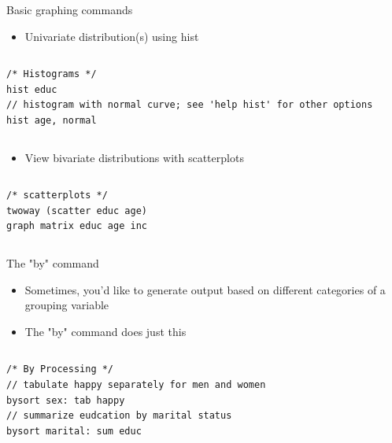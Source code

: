 \documentclass[table,smaller]{beamer}
\begin{document}
\begin{frame}[fragile,label=sec-3-1]{Basic graphing commands}
 \begin{itemize}
\item Univariate distribution(s) using \alert{hist}
\end{itemize}
\vspace{-.5em} \begin{columns}  \begin{block}{}
\begin{verbatim}
/* Histograms */
hist educ
// histogram with normal curve; see 'help hist' for other options
hist age, normal
\end{verbatim}

\end{block} \end{columns}

\begin{itemize}
\item View bivariate distributions with scatterplots
\end{itemize}
\vspace{-.5em} \begin{columns}  \begin{block}{}
\begin{verbatim}
/* scatterplots */
twoway (scatter educ age)
graph matrix educ age inc
\end{verbatim}

\end{block} \end{columns}
\end{frame}

\begin{frame}[fragile,label=sec-3-2]{The "by" command}
 \begin{itemize}
\item Sometimes, you'd like to generate  output based on different categories of a grouping variable
\item The "by" command does just this
\end{itemize}

\vspace{-.5em} \begin{columns}  \begin{block}{}
\begin{verbatim}
/* By Processing */
// tabulate happy separately for men and women
bysort sex: tab happy
// summarize eudcation by marital status
bysort marital: sum educ
\end{verbatim}

\end{block} \end{columns}
\end{frame}
\end{document}
